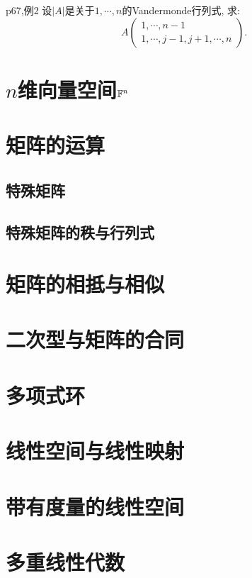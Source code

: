 \begin{example}{p67,例2}
	设$|A|$是关于$1,\cdots ,n$的Vandermonde行列式, 求: $$A \begin{pmatrix}
		1,\cdots ,n-1 \\ 1,\cdots ,j-1,j+1,\cdots ,n
	\end{pmatrix}.$$
\end{example}







\chapter{$n$维向量空间$\mathbb{F} ^n$}







\chapter{矩阵的运算}

\section{特殊矩阵}




\section{特殊矩阵的秩与行列式}





\chapter{矩阵的相抵与相似}




\chapter{二次型与矩阵的合同}





\chapter{多项式环}




\chapter{线性空间与线性映射}





\chapter{带有度量的线性空间}




\chapter{多重线性代数}